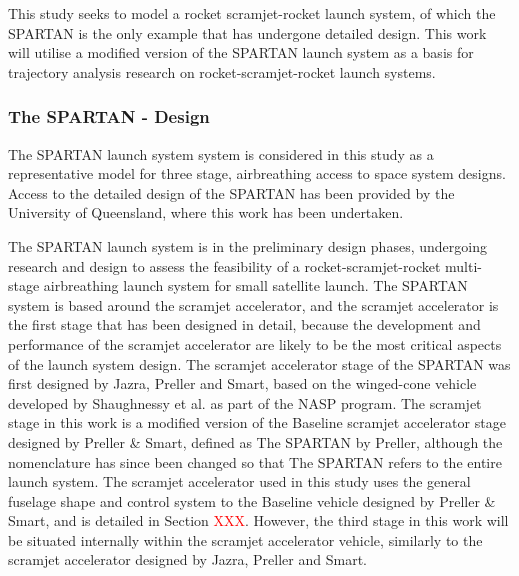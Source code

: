 This study seeks to model a rocket scramjet-rocket launch system, of which the SPARTAN is the only example that has undergone detailed design. This work will utilise a modified version of the SPARTAN launch system as a basis for trajectory analysis research on rocket-scramjet-rocket launch systems. 


\subsubsection{The SPARTAN - Design}


 The SPARTAN launch system system is considered in this study as a representative model for three stage, airbreathing access to space system designs. 
 Access to the detailed design of the SPARTAN has been provided by the University of Queensland, where this work has been undertaken.
 
 The SPARTAN launch system is in the preliminary design phases, undergoing research and design to assess the feasibility of a rocket-scramjet-rocket multi-stage airbreathing launch system for small satellite launch. 
 The SPARTAN system is based around the scramjet accelerator, and the scramjet accelerator is the first stage that has been designed in detail, because the development and performance of the scramjet accelerator are likely to be the most critical aspects of the launch system design. 
 The scramjet accelerator stage of the SPARTAN was first designed by Jazra, Preller and Smart\cite{Jazra2010, Jazra2013}, based on the winged-cone vehicle developed by Shaughnessy et al. as part of the NASP program\cite{Shaughnessy1990}. The scramjet stage in this work is a modified version of the Baseline scramjet accelerator stage designed by Preller \& Smart\cite{Preller2018a,Preller2017b}, defined as The SPARTAN by Preller, although the nomenclature has since been changed so that The SPARTAN refers to the entire launch system. The scramjet accelerator used in this study uses the general fuselage shape and control system to the Baseline vehicle designed by Preller \& Smart, and is detailed in Section \textcolor{red}{XXX}. However, the third stage in this work will be situated internally within the scramjet accelerator vehicle, similarly to the scramjet accelerator designed by Jazra, Preller and Smart\cite{Jazra2013}. 
 
